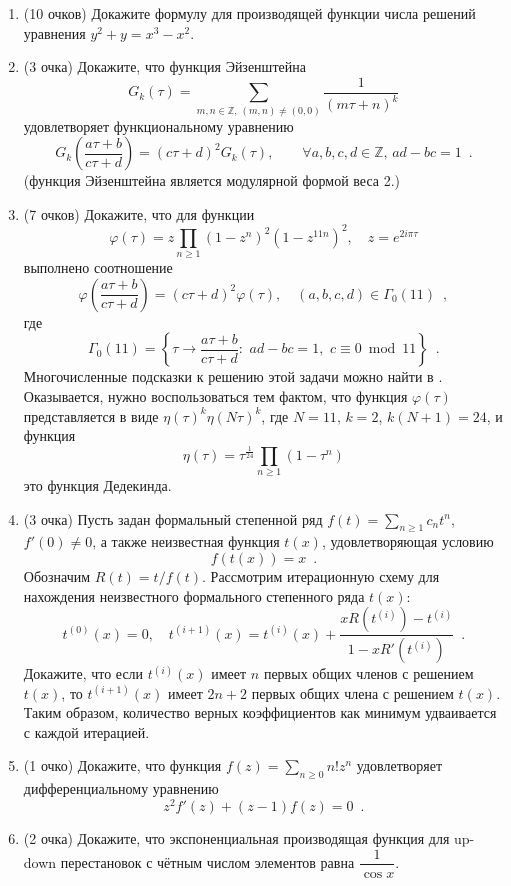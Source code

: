 \documentclass[a5paper]{article}
\theoremstyle{definition}
\begin{document}
\begin{enumerate}
\item(10 очков) Докажите формулу для производящей функции числа решений уравнения \( y^2 + y = x^3 - x^2 \).

\item(3 очка) Докажите, что функция Эйзенштейна
\[
	G_k(\tau) = \sum_{m,n\in \mathbb Z, \, (m,n) \neq (0,0)} \dfrac{1}{(m \tau + n)^k}
\]
удовлетворяет функциональному уравнению
\[
	G_k\left( \dfrac{a \tau + b}{c \tau + d}\right) = (c \tau + d)^2 G_k(\tau),
\qquad \forall a,b,c,d \in \mathbb Z, \, ad - bc = 1 \enspace .
\]
(функция Эйзенштейна является модулярной формой веса 2.)

\item(7 очков) Докажите, что
для функции
\[
    \varphi(\tau) = z \prod_{n \geq 1}(1 - z^n)^2 (1 - z^{11n})^2, \quad z =
e^{2 i \pi \tau}
\]
выполнено соотношение
\[
	\varphi \left(\dfrac{a \tau + b}{c \tau + d}\right) = (c \tau + d)^{2} \varphi (\tau), \quad
	(a,b,c,d) \in \Gamma_0(11) \enspace ,
\]
где
\[
    \Gamma_0(11) = \left\{
    \tau \to \dfrac{a \tau + b}{c \tau + d} \colon \,\, ad - bc = 1,\,\, c
\equiv 0 \bmod 11
\right\} \enspace .
\]
Многочисленные подсказки к решению этой задачи можно найти в
\cite[Proposition 3.2.2]{first_course_modular_forms}. Оказывается, нужно
воспользоваться тем фактом, что функция \( \varphi(\tau) \) представляется в
виде \( \eta(\tau)^k \eta(N \tau)^k  \), где \( N = 11, \, k = 2 \), \( k(N+1) =
24 \), и функция
\[
    \eta(\tau) = \tau^{\frac{1}{24}} \prod_{n \geq 1}(1 -
    \tau^n)
\]
это функция Дедекинда.

\item(3 очка) Пусть задан формальный степенной ряд \( f(t) = \sum_{n \geq 1} c_n t^n \), \( f'(0) \neq 0 \), а также неизвестная функция \( t(x) \), удовлетворяющая условию
\[
	f(t(x)) = x \enspace .
\]
Обозначим \( R(t) = t / f(t) \).
Рассмотрим итерационную схему для нахождения неизвестного формального степенного ряда \( t(x) \):
\[
	t^{(0)}(x) = 0, \quad
	t^{(i+1)}(x) = t^{(i)}(x) + \dfrac{x R(t^{(i)}) - t^{(i)}}{1 - x R'(t^{(i)})} \enspace .
\]
Докажите, что если \( t^{(i)}(x) \) имеет \( n \) первых общих членов с решением \( t(x) \), то \( t^{(i+1)}(x) \) имеет \( 2n + 2 \) первых общих члена с решением \( t(x) \). Таким образом, количество верных коэффициентов как минимум удваивается с каждой итерацией.

\item(1 очко) Докажите, что функция \( f(z) = \sum_{n \geq 0} n! z^n \)
удовлетворяет дифференциальному уравнению 
\[
    z^2 f'(z) + (z-1) f(z) = 0 \enspace .
\]
\item(2 очка) Докажите, что экспоненциальная производящая функция для up-down перестановок с чётным числом элементов равна \( \dfrac{1}{\cos x} \).
\end{enumerate}

\footnotesize


    
\end{document}
